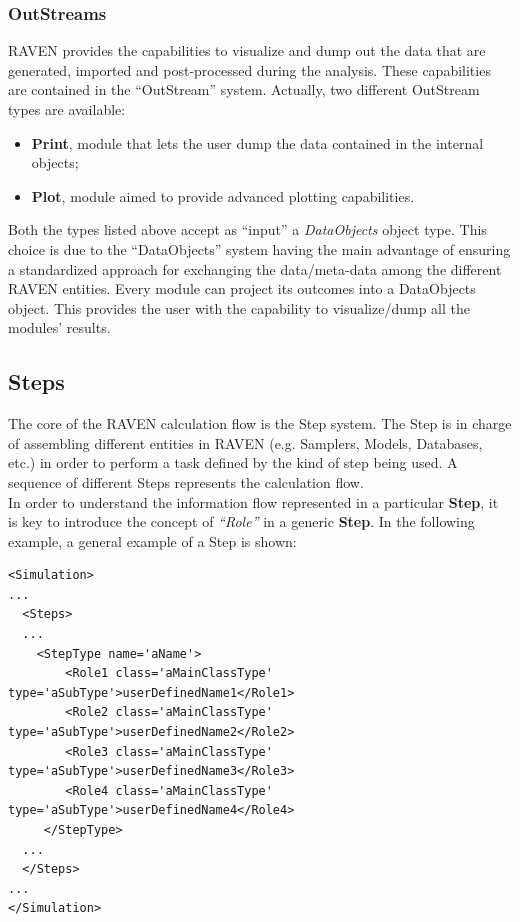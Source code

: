 \subsubsection{OutStreams}
RAVEN provides the capabilities to visualize and dump out the data that are generated, imported and 
post-processed during the analysis. These capabilities are contained in the ``OutStream'' system.
 Actually, two different OutStream types are available:
 \begin{itemize}
   \item \textbf{Print}, module that lets the user dump the data contained in the internal objects;
   \item \textbf{Plot}, module aimed to provide advanced plotting capabilities.
 \end{itemize}
Both the types listed above accept as ``input'' a \textit{DataObjects} object type. 
This choice is due to the ``DataObjects'' system  having the main advantage of ensuring a standardized approach for 
exchanging the data/meta-data among the different RAVEN entities. 
Every module can project its outcomes into a DataObjects object. This provides the 
user with the capability to visualize/dump all the modules' results. 

\subsection{Steps}
The core of the RAVEN calculation flow is the Step system. 
The Step is in charge of assembling different entities in RAVEN (e.g. Samplers, Models, Databases, etc.) in order to 
perform a task defined by the kind of step being used. A sequence of 
different Steps represents the calculation flow.
\\In order to understand the information flow represented in a particular \textbf{Step}, it is
key to introduce the concept of \textit{``Role''} in a generic  \textbf{Step}. 
In the following example, a general example of a Step is shown:
\begin{lstlisting}[style=XML,morekeywords={class}]
<Simulation>
...
  <Steps>
  ...
    <StepType name='aName'>
        <Role1 class='aMainClassType' type='aSubType'>userDefinedName1</Role1> 
        <Role2 class='aMainClassType' type='aSubType'>userDefinedName2</Role2> 
        <Role3 class='aMainClassType' type='aSubType'>userDefinedName3</Role3> 
        <Role4 class='aMainClassType' type='aSubType'>userDefinedName4</Role4> 
     </StepType>
  ...
  </Steps>
...
</Simulation>
\end{lstlisting}

